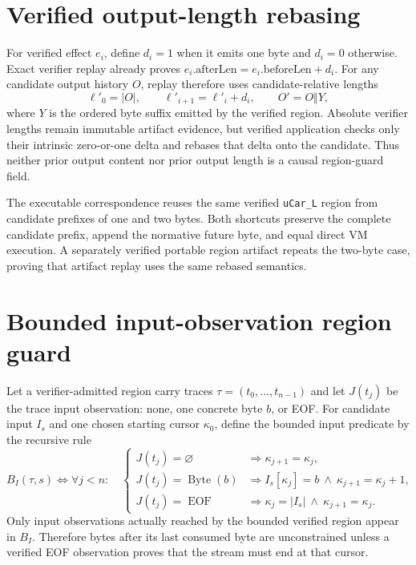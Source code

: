 \documentclass{article}
\begin{document}
\section{Verified output-length rebasing}

For verified effect $e_i$, define $d_i=1$ when it emits one byte and $d_i=0$
otherwise. Exact verifier replay already proves
$e_i.\mathrm{afterLen}=e_i.\mathrm{beforeLen}+d_i$. For any candidate output
history $O$, replay therefore uses candidate-relative lengths
\begin{equation}
  \ell'_0=|O|,\qquad
  \ell'_{i+1}=\ell'_i+d_i,\qquad
  O'=O\Vert Y,
  \label{eq:state-graph-region-output-length-rebase}
\end{equation}
where $Y$ is the ordered byte suffix emitted by the verified region. Absolute
verifier lengths remain immutable artifact evidence, but verified application
checks only their intrinsic zero-or-one delta and rebases that delta onto the
candidate. Thus neither prior output content nor prior output length is a causal
region-guard field.

The executable correspondence reuses the same verified \texttt{uCar\_L}
region from candidate prefixes of one and two bytes. Both shortcuts preserve the
complete candidate prefix, append the normative future byte, and equal direct VM
execution. A separately verified portable region artifact repeats the two-byte
case, proving that artifact replay uses the same rebased semantics.

\section{Bounded input-observation region guard}

Let a verifier-admitted region carry traces
$\tau=(t_0,\ldots,t_{n-1})$ and let $J(t_j)$ be the trace input observation:
none, one concrete byte $b$, or EOF. For candidate input $I_s$ and one chosen
starting cursor $\kappa_0$, define the bounded input predicate by the recursive
rule
\begin{equation}
  B_I(\tau,s)\Longleftrightarrow
  \forall j<n:\quad
  \begin{cases}
    J(t_j)=\varnothing
      &\Rightarrow \kappa_{j+1}=\kappa_j,\\
    J(t_j)=\operatorname{Byte}(b)
      &\Rightarrow I_s[\kappa_j]=b\ \land\
        \kappa_{j+1}=\kappa_j+1,\\
    J(t_j)=\operatorname{EOF}
      &\Rightarrow \kappa_j=|I_s|\ \land\
        \kappa_{j+1}=\kappa_j.
  \end{cases}
  \label{eq:state-graph-region-bounded-input-observation}
\end{equation}
Only input observations actually reached by the bounded verified region appear
in
$B_I$. Therefore bytes after its last consumed byte are unconstrained unless a
verified EOF observation proves that the stream must end at that cursor.
\end{document}
